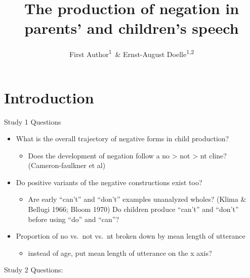 \documentclass[man,floatsintext,draftall]{apa6}
\title{The production of negation in parents' and children's speech}
\author{First Author\textsuperscript{1}~\& Ernst-August Doelle\textsuperscript{1,2}}
\date{}
\affiliation{
\vspace{0.5cm}
\textsuperscript{1} Wilhelm-Wundt-University\\\textsuperscript{2} Konstanz Business School}
\providecommand{\tightlist}{%
  \setlength{\itemsep}{0pt}\setlength{\parskip}{0pt}}
\begin{document}
\maketitle

\hypertarget{introduction}{%
\section{Introduction}\label{introduction}}

Study 1 Questions

\begin{itemize}
\item
  What is the overall trajectory of negative forms in child production?

  \begin{itemize}
  \tightlist
  \item
    Does the development of negation follow a no \textgreater{} not \textgreater{} nt cline? (Cameron-faulkner et al)
  \end{itemize}
\item
  Do positive variants of the negative constructions exist too?

  \begin{itemize}
  \tightlist
  \item
    Are early \enquote{can't} and \enquote{don't} examples unanalyzed wholes? (Klima \& Bellugi 1966; Bloom 1970) Do children produce \enquote{can't} and \enquote{don't} before using \enquote{do} and \enquote{can}?
  \end{itemize}
\item
  Proportion of no vs.~not vs.~nt broken down by mean length of utterance

  \begin{itemize}
  \tightlist
  \item
    instead of age, put mean length of utterance on the x axis?
  \end{itemize}
\end{itemize}

Study 2 Questions:
\end{document}
